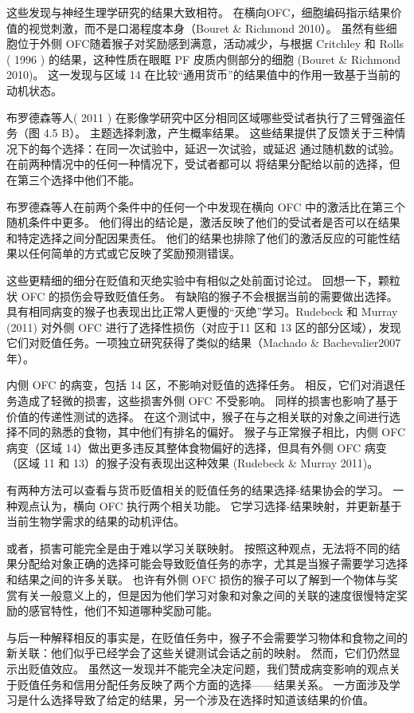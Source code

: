 这些发现与神经生理学研究的结果大致相符。 在横向OFC，细胞编码指示结果价值的视觉刺激，而不是口渴程度本身（Bouret \& Richmond 2010）。 虽然有些细胞位于外侧 OFC随着猴子对奖励感到满意，活动减少，与根据 Critchley 和 Rolls ( 1996 ) 的结果，这种性质在眼眶 PF 皮质内侧部分的细胞 (Bouret \& Richmond 2010)。 这一发现与区域 14 在比较“通用货币”的结果值中的作用一致基于当前的动机状态。\par
布罗德森等人( 2011 ) 在影像学研究中区分相同区域哪些受试者执行了三臂强盗任务（图 4.5 B）。 主题选择刺激，产生概率结果。 这些结果提供了反馈关于三种情况下的每个选择：在同一次试验中，延迟一次试验，或延迟
通过随机数的试验。 在前两种情况中的任何一种情况下，受试者都可以
将结果分配给以前的选择，但在第三个选择中他们不能。\par
布罗德森等人在前两个条件中的任何一个中发现在横向 OFC 中的激活比在第三个随机条件中更多。 他们得出的结论是，激活反映了他们的受试者是否可以在结果和特定选择之间分配因果责任。 他们的结果也排除了他们的激活反应的可能性结果以任何简单的方式或它反映了奖励预测错误。\par
这些更精细的细分在贬值和灭绝实验中有相似之处前面讨论过。 回想一下，颗粒状 OFC 的损伤会导致贬值任务。 有缺陷的猴子不会根据当前的需要做出选择。具有相同病变的猴子也表现出比正常人更慢的“灭绝”学习。Rudebeck 和 Murray (2011) 对外侧 OFC 进行了选择性损伤（对应于11 区和 13 区的部分区域），发现它们对贬值任务。一项独立研究获得了类似的结果（Machado \& Bachevalier2007 年）。\par
内侧 OFC 的病变，包括 14 区，不影响对贬值的选择任务。 相反，它们对消退任务造成了轻微的损害，这些损害外侧 OFC 不受影响。 同样的损害也影响了基于价值的传递性测试的选择。 在这个测试中，猴子在与之相关联的对象之间进行选择不同的熟悉的食物，其中他们有排名的偏好。 猴子与正常猴子相比，内侧 OFC 病变（区域 14）做出更多违反其整体食物偏好的选择，但具有外侧 OFC 病变（区域 11 和 13）的猴子没有表现出这种效果 (Rudebeck \& Murray 2011)。\par
有两种方法可以查看与货币贬值相关的贬值任务的结果选择-结果协会的学习。 一种观点认为，横向 OFC 执行两个相关功能。 它学习选择-结果映射，并更新基于当前生物学需求的结果的动机评估。\par
或者，损害可能完全是由于难以学习关联映射。 按照这种观点，无法将不同的结果分配给对象正确的选择可能会导致贬值任务的赤字，尤其是当猴子需要学习选择和结果之间的许多关联。 也许有外侧 OFC 损伤的猴子可以了解到一个物体与奖赏有关一般意义上的，但是因为他们学习对象和对象之间的关联的速度很慢特定奖励的感官特性，他们不知道哪种奖励可能。\par
与后一种解释相反的事实是，在贬值任务中，猴子不会需要学习物体和食物之间的新关联：他们似乎已经学会了这些关键测试会话之前的映射。 然而，它们仍然显示出贬值效应。 虽然这一发现并不能完全决定问题，我们赞成病变影响的观点关于贬值任务和信用分配任务反映了两个方面的选择——结果关系。 一方面涉及学习是什么选择导致了给定的结果，另一个涉及在选择时知道该结果的价值。\par
